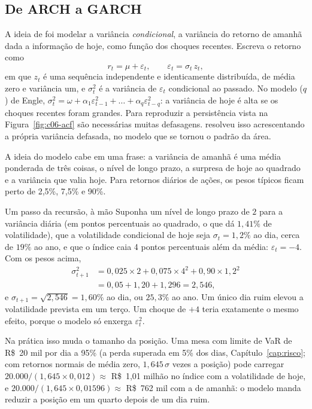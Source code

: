 \subsection{De ARCH a GARCH}

A ideia de \citet{engle1982} foi modelar a variância \emph{condicional}, a variância do retorno de amanhã dada a informação de hoje, como função dos choques recentes. Escreva o retorno como
\begin{equation}
  r_t = \mu + \varepsilon_t , \qquad \varepsilon_t = \sigma_t\,z_t ,
  \label{eq:c06-media}
\end{equation}
em que $z_t$ é uma sequência independente e identicamente distribuída, de média zero e variância um, e $\sigma_t^2$ é a variância de $\varepsilon_t$ condicional ao passado. No modelo ($q$) de Engle, $\sigma_t^2 = \omega + \alpha_1\varepsilon_{t-1}^2 + \dots + \alpha_q\varepsilon_{t-q}^2$: a variância de hoje é alta se os choques recentes foram grandes. Para reproduzir a persistência vista na Figura~\ref{fig:c06-acf} são necessárias muitas defasagens. \citet{bollerslev1986} resolveu isso acrescentando a própria variância defasada, no modelo que se tornou o padrão da área.

A ideia do modelo cabe em uma frase: a variância de amanhã é uma média ponderada de três coisas, o nível de longo prazo, a surpresa de hoje ao quadrado e a variância que valia hoje. Para retornos diários de ações, os pesos típicos ficam perto de 2,5\%, 7,5\% e 90\%.

\begin{exemplo}{Um passo da recursão, à mão}\label{ex:c06-passo}%
Suponha um nível de longo prazo de $2$ para a variância diária (em pontos percentuais ao quadrado, o que dá $1,41\%$ de volatilidade), que a volatilidade condicional de hoje seja $\sigma_t = 1,2\%$ ao dia, cerca de $19\%$ ao ano, e que o índice caia 4 pontos percentuais além da média: $\varepsilon_t = -4$. Com os pesos acima,
\begin{align*}
  \sigma_{t+1}^2 &= 0,025 \times 2 + 0,075 \times 4^2 + 0,90 \times 1,2^2 \\
                 &= 0,05 + 1,20 + 1,296 = 2,546 ,
\end{align*}
e $\sigma_{t+1} = \sqrt{2,546} = 1,60\%$ ao dia, ou $25,3\%$ ao ano. Um único dia ruim elevou a volatilidade prevista em um terço. Um choque de $+4$ teria exatamente o mesmo efeito, porque o modelo só enxerga $\varepsilon_t^2$.

Na prática isso muda o tamanho da posição. Uma mesa com limite de VaR de R\$~20 mil por dia a 95\% (a perda superada em 5\% dos dias, Capítulo~\ref{cap:risco}; com retornos normais de média zero, $1,645\,\sigma$ vezes a posição) pode carregar $20.000/(1,645 \times 0,012) \approx$ R\$~1,01 milhão no índice com a volatilidade de hoje, e $20.000/(1,645 \times 0,01596) \approx$ R\$~762 mil com a de amanhã: o modelo manda reduzir a posição em um quarto depois de um dia ruim.
\end{exemplo}

